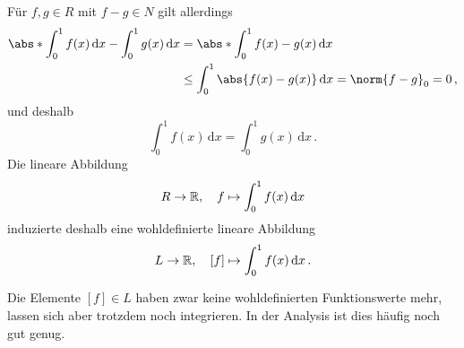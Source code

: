 Für $f, g \in R$ mit $f - g \in N$ gilt allerdings
\begin{align*}
        \abs*{ \int_0^1 f(x) \,\text{d}x - \int_0^1 g(x) \,\text{d}x }
  &=    \abs*{ \int_0^1 f(x) - g(x) \,\text{d}x } \\
  &\leq \int_0^1 \abs{f(x) - g(x)} \,\text{d}x
  =     \norm{f - g}_0
  =     0 \,,
\end{align*}
und deshalb
\[
    \int_0^1 f(x) \,\text{d}x
  = \int_0^1 g(x) \,\text{d}x \,.
\]
Die lineare Abbildung
\[
          R
  \to     \mathbb{R},
  \quad   f
  \mapsto \int_0^1 f(x) \,\text{d}x
\]
induzierte deshalb eine wohldefinierte lineare Abbildung
\[
          L
  \to     \mathbb{R},
  \quad   [f]
  \mapsto \int_0^1 f(x) \,\text{d}x \,.
\]

Die Elemente $[f] \in L$ haben zwar keine wohldefinierten Funktionswerte mehr, lassen sich aber trotzdem noch integrieren.
In der Analysis ist dies häufig noch gut genug.










